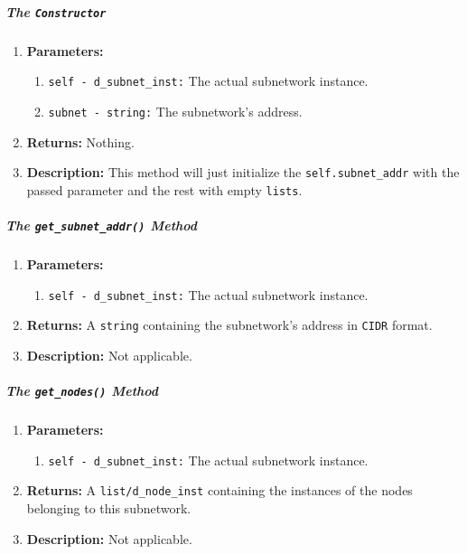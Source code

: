         \subparagraph{The \texttt{Constructor}}
            \begin{enumerate}
                \item \textbf{Parameters:}
                \begin{enumerate}
                    \item \texttt{self - d\_subnet\_inst:} The actual subnetwork instance.
                    \item \texttt{subnet - string:} The subnetwork's address.
                \end{enumerate}
                \item \textbf{Returns:} Nothing.
                \item \textbf{Description:} This method will just initialize the \texttt{self.subnet\_addr} with the passed parameter and the rest with empty \texttt{lists}.
            \end{enumerate}

        \subparagraph{The \texttt{get\_subnet\_addr()} Method}
            \begin{enumerate}
                \item \textbf{Parameters:}
                \begin{enumerate}
                    \item \texttt{self - d\_subnet\_inst:} The actual subnetwork instance.
                \end{enumerate}
                \item \textbf{Returns:} A \texttt{string} containing the subnetwork's address in \texttt{CIDR} format.
                \item \textbf{Description:} Not applicable.
            \end{enumerate}

        \subparagraph{The \texttt{get\_nodes()} Method}
            \begin{enumerate}
                \item \textbf{Parameters:}
                \begin{enumerate}
                    \item \texttt{self - d\_subnet\_inst:} The actual subnetwork instance.
                \end{enumerate}
                \item \textbf{Returns:} A \texttt{list/d\_node\_inst} containing the instances of the nodes belonging to this subnetwork.
                \item \textbf{Description:} Not applicable.
            \end{enumerate}

